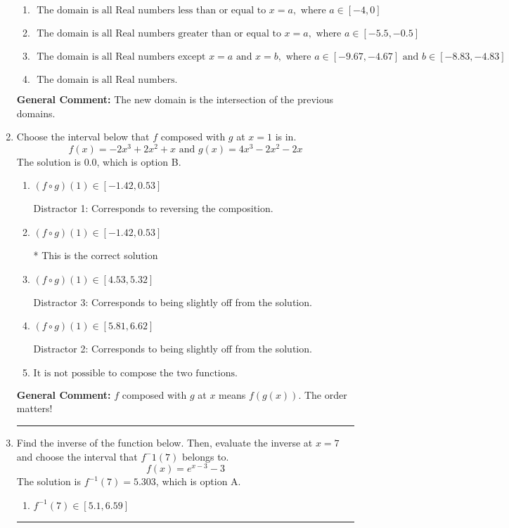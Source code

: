 \documentclass{extbook}[14pt]
\newcommand{\litem}[1]{\item #1

\rule{\textwidth}{0.4pt}}
\begin{document}
\begin{enumerate}
{\begin{enumerate}[label=\Alph*.]
\item \( \text{ The domain is all Real numbers less than or equal to } x = a, \text{ where } a \in [-4, 0] \)


\item \( \text{ The domain is all Real numbers greater than or equal to } x = a, \text{ where } a \in [-5.5, -0.5] \)


\item \( \text{ The domain is all Real numbers except } x = a \text{ and } x = b, \text{ where } a \in [-9.67, -4.67] \text{ and } b \in [-8.83, -4.83] \)


\item \( \text{ The domain is all Real numbers. } \)


\end{enumerate}

\textbf{General Comment:} The new domain is the intersection of the previous domains.
}
\litem{
Choose the interval below that $f$ composed with $g$ at $x=1$ is in.
\[ f(x) = -2x^{3} +2 x^{2} +x \text{ and } g(x) = 4x^{3} -2 x^{2} -2 x \]The solution is \( 0.0 \), which is option B.\begin{enumerate}[label=\Alph*.]
\item \( (f \circ g)(1) \in [-1.42, 0.53] \)

 Distractor 1: Corresponds to reversing the composition.
\item \( (f \circ g)(1) \in [-1.42, 0.53] \)

* This is the correct solution
\item \( (f \circ g)(1) \in [4.53, 5.32] \)

 Distractor 3: Corresponds to being slightly off from the solution.
\item \( (f \circ g)(1) \in [5.81, 6.62] \)

 Distractor 2: Corresponds to being slightly off from the solution.
\item \( \text{It is not possible to compose the two functions.} \)


\end{enumerate}

\textbf{General Comment:} $f$ composed with $g$ at $x$ means $f(g(x))$. The order matters!
}
\litem{
Find the inverse of the function below. Then, evaluate the inverse at $x = 7$ and choose the interval that $f^-1(7)$ belongs to.
\[ f(x) = e^{x-3}-3 \]The solution is \( f^{-1}(7) = 5.303 \), which is option A.\begin{enumerate}[label=\Alph*.]
\item \( f^{-1}(7) \in [5.1, 6.59] \)


\end{enumerate}}
\end{enumerate}
\end{document}
